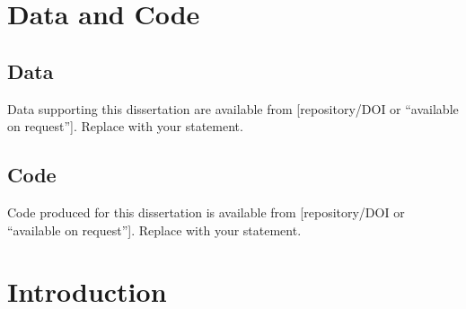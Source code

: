 \chapter{Data and Code}


\section{Data}
Data supporting this dissertation are available from [repository/DOI or ``available on request'']. Replace with your statement.

\section{Code}
Code produced for this dissertation is available from [repository/DOI or ``available on request'']. Replace with your statement.

\mainmatter

\chapter{Introduction}\label{ch1}


